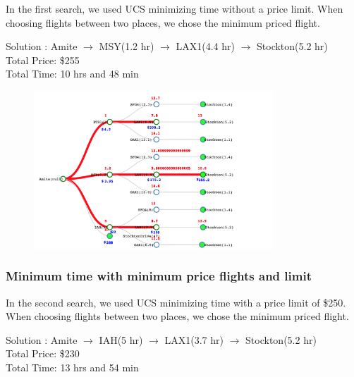 \documentclass[11pt]{article}
\begin{document}
In the first search, we used UCS minimizing time without a price limit. When choosing flights between two places, we chose the minimum priced flight.

\begin{center}
Solution : Amite $\rightarrow$ MSY(1.2 hr) $\rightarrow$ LAX1(4.4 hr) $\rightarrow$ Stockton(5.2 hr) \\
\quad Total Price: \$255 \\
\quad Total Time: 10 hrs and 48 min
\end{center}

\begin{figure}[!ht]
  \centering
  \includegraphics[width=0.8\textwidth]{time}
  \label{fig:time}
\end{figure}

\pagebreak

\subsubsection{Minimum time with minimum price flights and limit}

In the second search, we used UCS minimizing time with a price limit of \$250. When choosing flights between two places, we chose the minimum priced flight.

\begin{center}
Solution : Amite $\rightarrow$ IAH(5 hr) $\rightarrow$ LAX1(3.7 hr) $\rightarrow$ Stockton(5.2 hr) \\
\quad Total Price: \$230 \\
\quad Total Time: 13 hrs and 54 min\\
\end{center}
\end{document}
